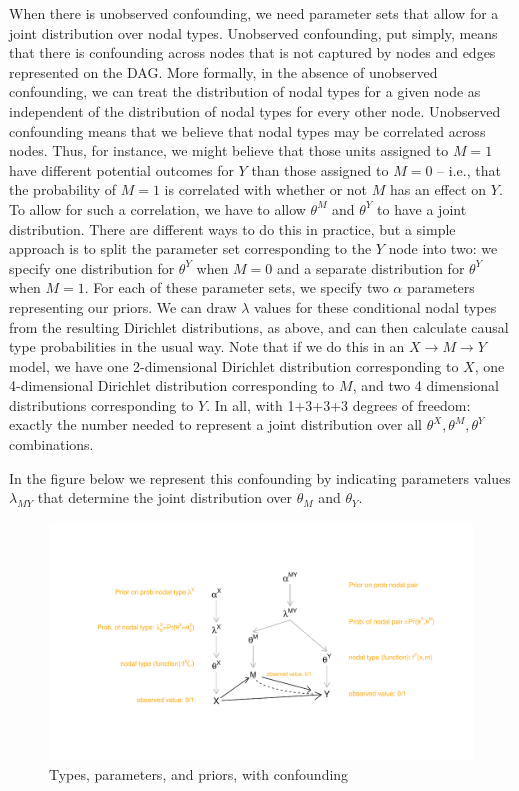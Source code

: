 \documentclass[
  12pt,
]{book}
\begin{document}
When there is unobserved confounding, we need parameter sets that allow for a joint distribution over nodal types. Unobserved confounding, put simply, means that there is confounding across nodes that is not captured by nodes and edges represented on the DAG. More formally, in the absence of unobserved confounding, we can treat the distribution of nodal types for a given node as independent of the distribution of nodal types for every other node. Unobserved confounding means that we believe that nodal types may be correlated across nodes. Thus, for instance, we might believe that those units assigned to \(M=1\) have different potential outcomes for \(Y\) than those assigned to \(M=0\) -- i.e., that the probability of \(M=1\) is correlated with whether or not \(M\) has an effect on \(Y\). To allow for such a correlation, we have to allow \(\theta^M\) and \(\theta^Y\) to have a joint distribution. There are different ways to do this in practice, but a simple approach is to split the parameter set corresponding to the \(Y\) node into two: we specify one distribution for \(\theta^Y\) when \(M=0\) and a separate distribution for \(\theta^Y\) when \(M=1\). For each of these parameter sets, we specify two \(\alpha\) parameters representing our priors. We can draw \(\lambda\) values for these conditional nodal types from the resulting Dirichlet distributions, as above, and can then calculate causal type probabilities in the usual way. Note that if we do this in an \(X \rightarrow M \rightarrow Y\) model, we have one 2-dimensional Dirichlet distribution corresponding to \(X\), one 4-dimensional Dirichlet distribution corresponding to \(M\), and two 4 dimensional distributions corresponding to \(Y\). In all, with 1+3+3+3 degrees of freedom: exactly the number needed to represent a joint distribution over all \(\theta^X, \theta^M, \theta^Y\) combinations.

In the figure below we represent this confounding by indicating parameters values \(\lambda_{MY}\) that determine the joint distribution over \(\theta_M\) and \(\theta_Y\).

\begin{figure}
\includegraphics[width=0.95\linewidth]{ii_files/figure-latex/unnamed-chunk-11-1} \caption{Types, parameters, and priors, with confounding}\label{fig:unnamed-chunk-11}
\end{figure}
\end{document}
